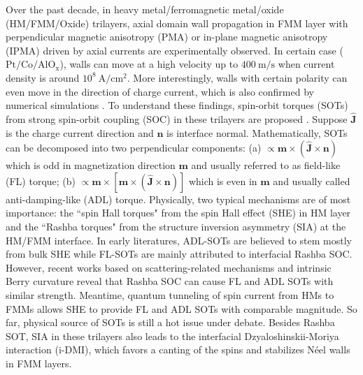 \documentclass[12pt]{iopart}
\begin{document}
Over the past decade, in heavy metal/ferromagnetic metal/oxide (HM/FMM/Oxide) trilayers,
axial domain wall propagation in FMM layer with perpendicular magnetic anisotropy (PMA) 
or in-plane magnetic anisotropy (IPMA) driven by axial currents are
experimentally observed\cite{Miron_Nmat_2010,Seo_APL_2010,Buhrman_Science_2012,Buhrman_PRL_2012,Garello_NatNanoTech_2013,
	Buhrman_PRL_2016,Buhrman_PRB_2016,Ghosh_PRAppl_2017,Moore_APL_2008,Miron_Nature_2011,Beach_Nmat_2013,
	Lee_PRL_2011,Miron_Nmat_2011,Beach_APL_2012,Stuart_APE_2012,Koopmans_APL_2012,Parkin_NatNanoTech_2013}.
In certain case ($\mathrm{Pt/Co/AlO_x}$), walls can move at a high velocity up to $400\ \mathrm{m/s}$
when current density is around $10^{8}\ \mathrm{A/cm^2}$\cite{Miron_Nmat_2011}.
More interestingly, walls with certain polarity can even move in the
direction of charge current\cite{Moore_APL_2008,Miron_Nature_2011,Beach_Nmat_2013,Lee_PRL_2011,Miron_Nmat_2011,
	Beach_APL_2012,Stuart_APE_2012,Koopmans_APL_2012,Parkin_NatNanoTech_2013},
which is also confirmed by numerical simulations
\cite{Linder_PRB_2013a,Martinez_AIPAdv_2013,Miron_JAP_2014,Stier_PRB_2014}.
To understand these findings, spin-orbit torques (SOTs) from strong
spin-orbit coupling (SOC) in these trilayers are proposed
\cite{Zhang_PRB_2008,Zhang_PRB_2009,Matos_PRB_2009,Miron_RoyalSocietyA_2011,Manchon_PRB_2013a,Manchon_PRB_2013b,
	Manchon_PRL_2012,Seo_PRB_2012,Pesin_PRB_2012,Bijl_PRB_2012,Qaiumzadeh_PRB_2015,Kurebayashi_NatNanoTech_2014,Li_PRB_2015,
	ChenWei_PRL_2015}.
Suppose $\hat{\mathbf{J}}$ is the charge current direction and
$\mathbf{n}$ is interface normal.
Mathematically, SOTs can be decomposed into two perpendicular components:
(a) $\propto\mathbf{m}\times(\hat{\mathbf{J}}\times\mathbf{n})$ which is odd
in magnetization direction $\mathbf{m}$ and usually referred to as field-like (FL) torque;
(b) $\propto\mathbf{m}\times[\mathbf{m}\times(\hat{\mathbf{J}}\times\mathbf{n})]$
which is even in $\mathbf{m}$ and usually called anti-damping-like (ADL) torque.
Physically, two typical mechanisms are of most importance:
the ``spin Hall torques" from the spin Hall effect (SHE)\cite{Hirsch_PRL_1999} in HM layer and
the ``Rashba torques" from the structure inversion asymmetry (SIA) at the HM/FMM interface.
In early literatures, ADL-SOTs are believed to stem mostly from bulk SHE
while FL-SOTs are mainly attributed to interfacial Rashba SOC.
However, recent works based on scattering-related mechanisms\cite{Manchon_PRL_2012,Seo_PRB_2012,Pesin_PRB_2012,Bijl_PRB_2012,Qaiumzadeh_PRB_2015}
and intrinsic Berry curvature\cite{Kurebayashi_NatNanoTech_2014,Li_PRB_2015}
reveal that Rashba SOC can cause FL and ADL SOTs with similar strength.
Meantime, quantum tunneling of spin current from HMs to FMMs\cite{ChenWei_PRL_2015} allows
SHE to provide FL and ADL SOTs with comparable magnitude.
So far, physical source of SOTs is still a hot issue under debate\cite{Freimuth_PRB_2014,Stiles_PRB__2016a,Stiles_PRB__2016b,Ado_PRB_2017}.
Besides Rashba SOT, SIA in these trilayers also leads to the 
interfacial Dzyaloshinskii-Moriya interaction (i-DMI)\cite{Dzyaloshinskii_1957,Moriya_1957,Dzyaloshinskii_1965}, 
which favors a canting of the spins and stabilizes 
N\'{e}el walls in FMM layers.
\end{document}
